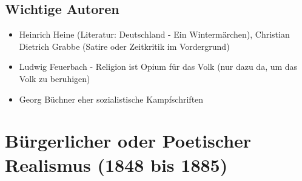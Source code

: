 \documentclass[12pt,a4paper]{article}
\begin{document}
\subsection{Wichtige Autoren}

\begin{itemize}
\item Heinrich Heine (Literatur: Deutschland - Ein Wintermärchen), Christian Dietrich Grabbe (Satire oder Zeitkritik im Vordergrund)
\item Ludwig Feuerbach - Religion ist Opium für das Volk (nur dazu da, um das Volk zu beruhigen)
\item Georg Büchner eher sozialistische Kampfschriften
\end{itemize}

\newpage

\section{Bürgerlicher oder Poetischer Realismus (1848 bis 1885)}
\end{document}
